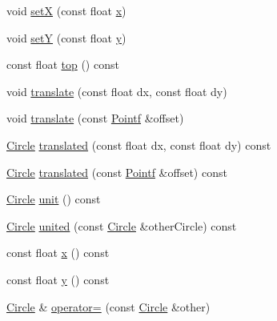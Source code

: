 \begin{DoxyCompactItemize}
void \hyperlink{classprism_1_1geometry_1_1_circle_a941a990726b98aad91d8a1e462919078}{setX} (const float \hyperlink{classprism_1_1geometry_1_1_circle_aeb38df0ed8d1b3b84c4eb42b50a05348}{x})
\item 
void \hyperlink{classprism_1_1geometry_1_1_circle_adcd2f40040d78de715d3cb1f7cef3ce0}{setY} (const float \hyperlink{classprism_1_1geometry_1_1_circle_aea5997071a76ee672b6b7ec0908ebe11}{y})
\item 
const float \hyperlink{classprism_1_1geometry_1_1_circle_a52bda730f4f2b90a2f1817e4efaea158}{top} () const 
\item 
void \hyperlink{classprism_1_1geometry_1_1_circle_a594995da05e613977b0c7bd85528753b}{translate} (const float dx, const float dy)
\item 
void \hyperlink{classprism_1_1geometry_1_1_circle_aec90aaa751dfb33e0aa874dc68913489}{translate} (const \hyperlink{classprism_1_1geometry_1_1_pointf}{Pointf} \&offset)
\item 
\hyperlink{classprism_1_1geometry_1_1_circle}{Circle} \hyperlink{classprism_1_1geometry_1_1_circle_a77cb41b6ca766b3871c352dd1cc33727}{translated} (const float dx, const float dy) const 
\item 
\hyperlink{classprism_1_1geometry_1_1_circle}{Circle} \hyperlink{classprism_1_1geometry_1_1_circle_aa52624590986822687ed64d54dc1cc6e}{translated} (const \hyperlink{classprism_1_1geometry_1_1_pointf}{Pointf} \&offset) const 
\item 
\hyperlink{classprism_1_1geometry_1_1_circle}{Circle} \hyperlink{classprism_1_1geometry_1_1_circle_a0e4d6c1aaec74c68e86054dbf835f30b}{unit} () const 
\item 
\hyperlink{classprism_1_1geometry_1_1_circle}{Circle} \hyperlink{classprism_1_1geometry_1_1_circle_ae7a4b0fb426bc2ab657f12f4e5e2321c}{united} (const \hyperlink{classprism_1_1geometry_1_1_circle}{Circle} \&other\+Circle) const 
\item 
const float \hyperlink{classprism_1_1geometry_1_1_circle_aeb38df0ed8d1b3b84c4eb42b50a05348}{x} () const 
\item 
const float \hyperlink{classprism_1_1geometry_1_1_circle_aea5997071a76ee672b6b7ec0908ebe11}{y} () const 
\item 
\hyperlink{classprism_1_1geometry_1_1_circle}{Circle} \& \hyperlink{classprism_1_1geometry_1_1_circle_a3a77e4ec76dfcc5c826a99a2d97a9fca}{operator=} (const \hyperlink{classprism_1_1geometry_1_1_circle}{Circle} \&other)
\end{DoxyCompactItemize}
